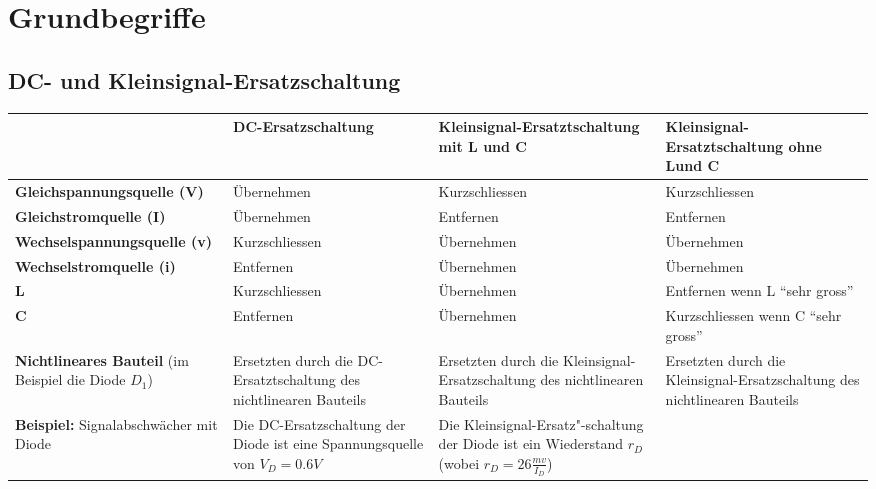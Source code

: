 \section{Grundbegriffe}
	
		\subsection{DC- und Kleinsignal-Ersatzschaltung}
			\begin{tabular}{|p{4.3cm}|p{3.93cm}|p{4.5cm}|p{4.5cm}|}
			\hline
			& \footnotesize{\textbf{DC-Ersatzschaltung}} 
			& \footnotesize{\textbf{Kleinsignal-Ersatztschaltung mit L und C}}	
			& \footnotesize{\textbf{Kleinsignal-Ersatztschaltung ohne L\footnotemark[1] und C\footnotemark[2]}}
			\\ \hline
			\footnotesize{\textbf{Gleichspannungsquelle (V)}} 
			& \cellcolor{lightgrey}Übernehmen 
			& Kurzschliessen\footnotemark[3] 
			& Kurzschliessen\footnotemark[3] 
			\\ \hline
			\footnotesize{\textbf{Gleichstromquelle (I)}} 
			& \cellcolor{lightgrey}Übernehmen 
			& Entfernen\footnotemark[4] 
			& Entfernen\footnotemark[4] 
			\\ \hline
			\footnotesize{\textbf{Wechselspannungsquelle (v)}} 
			& Kurzschliessen\footnotemark[3] 
			& \cellcolor{lightgrey}Übernehmen 
			& \cellcolor{lightgrey}Übernehmen
			\\ \hline
			\footnotesize{\textbf{Wechselstromquelle (i)}} 
			& Entfernen\footnotemark[4] 
			& \cellcolor{lightgrey}Übernehmen 
			& \cellcolor{lightgrey}Übernehmen
			\\ \hline
			\footnotesize{\textbf{L}} 
			& Kurzschliessen\footnotemark[5] 
			& \cellcolor{lightgrey}Übernehmen 
			& Entfernen wenn L ``sehr gross''\footnotemark[1]
			\\ \hline
			\footnotesize{\textbf{C}} 
			& Entfernen\footnotemark[6] 
			& \cellcolor{lightgrey}Übernehmen 
			& Kurzschliessen wenn C ``sehr gross''\footnotemark[2]
			\\ \hline
			\footnotesize{\textbf{Nichtlineares Bauteil}} (im Beispiel die Diode $D_1$) 
			& Ersetzten durch die DC-Ersatztschaltung des nichtlinearen Bauteils
			& Ersetzten durch die Kleinsignal-Ersatzschaltung des nichtlinearen Bauteils
			& Ersetzten durch die Kleinsignal-Ersatzschaltung des nichtlinearen Bauteils
			\\ \hline
			\textbf{Beispiel:} Signalabschwächer mit Diode
			& Die DC-Ersatzschaltung der Diode ist eine Spannungsquelle von $V_D = 0.6V$
			& Die Kleinsignal-Ersatz"-schaltung der Diode ist ein Wiederstand $r_D$ (wobei $r_D = 26 \frac{mv}{I_D}$)

\end{tabular}
